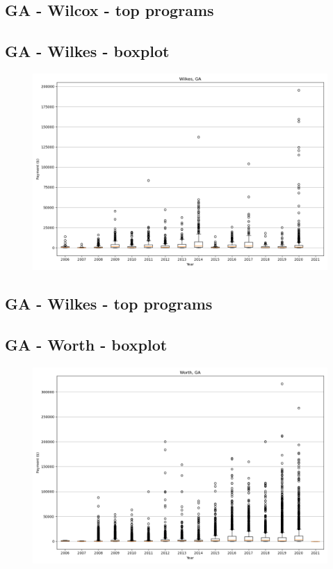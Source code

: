 \subsection*{GA - Wilcox - top programs}

\newpage
\subsection*{GA - Wilkes - boxplot}
\begin{figure}[h]
\centering
\includegraphics[width=7in]{../output/boxplots/counties/Wilkes-GA_boxplot.png}
\end{figure}


\subsection*{GA - Wilkes - top programs}

\newpage
\subsection*{GA - Worth - boxplot}
\begin{figure}[h]
\centering
\includegraphics[width=7in]{../output/boxplots/counties/Worth-GA_boxplot.png}
\end{figure}



